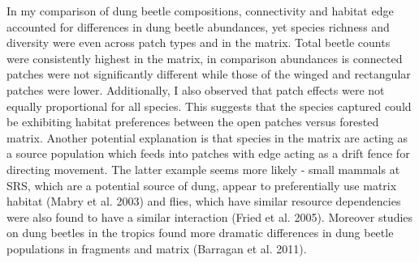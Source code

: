 \documentclass[
  man, donotrepeattitle]{apa6}
\begin{document}
In my comparison of dung beetle compositions, connectivity and habitat edge accounted for differences in dung beetle abundances, yet species richness and diversity were even across patch types and in the matrix. Total beetle counts were consistently highest in the matrix, in comparison abundances is connected patches were not significantly different while those of the winged and rectangular patches were lower. Additionally, I also observed that patch effects were not equally proportional for all species. This suggests that the species captured could be exhibiting habitat preferences between the open patches versus forested matrix. Another potential explanation is that species in the matrix are acting as a source population which feeds into patches with edge acting as a drift fence for directing movement. The latter example seems more likely - small mammals at SRS, which are a potential source of dung, appear to preferentially use matrix habitat (Mabry et al. 2003) and flies, which have similar resource dependencies were also found to have a similar interaction (Fried et al. 2005). Moreover studies on dung beetles in the tropics found more dramatic differences in dung beetle populations in fragments and matrix (Barragan et al. 2011).
\end{document}
